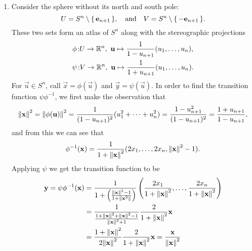 \documentclass[12pt]{memoir}
\def\co{\colon}
\newcommand{\from}{\co\!\!}
\begin{document}
   \begin{ptcbr}
   \begin{enumerate}
	\item Consider the sphere without its north and south pole:
	$$U=S^n\setminus\{\,\mathbf{e}_{n+1}\,\},\quad\text{and}\quad V=S^n\setminus\{\,-\mathbf{e}_{n+1}\,\}.$$
	These two sets form an atlas of $S^n$ along with the stereographic projections
	\begin{gather*}
		\phi\from U\to\bR^n,\ \vec u\mapsto \frac{1}{1-u_{n+1}}(u_1,\dots,u_{n}),\\
		\psi\from V\to\bR^n,\ \vec u\mapsto \frac{1}{1+u_{n+1}}(u_1,\dots,u_{n}).
	\end{gather*}
	For $\vec u\in S^n$, call $\vec x=\phi(\vec u)$ and $\vec y=\psi(\vec u)$. In order to find the transition function $\psi\phi^{-1}$, we first make the observation that 
	$$\norm{\mathbf{x}}^2=\norm{\phi(\mathbf{u})}^2=\frac{1}{(1-u_{n+1})^2}(u_1^2+\dots+u_{n}^2)=\frac{1-u_{n+1}^2}{(1-u_{n+1})^2}=\frac{1+u_{n+1}}{1-u_{n+1}},$$
	and from this we can see that 
	$$\phi^{-1}(\mathbf{x})=\frac{1}{1+\norm{\mathbf{x}}^2}(2x_1,\dots,2x_n,\norm{\mathbf{x}}^2-1).$$
	Applying $\psi$ we get the transition function to be
	\begin{align*}
		\mathbf{y}=\psi\phi^{-1}(\mathbf{x})&=\frac{1}{1+\left(\frac{\norm{\mathbf{x}}^2-1}{1+\norm{\mathbf{x}^2}}\right)}\left(\frac{2x_1}{1+\norm{\mathbf{x}}^2},\dots,\frac{2x_n}{1+\norm{\mathbf{x}}^2}\right)\\
		&=\frac{1}{\frac{1+\norm{\mathbf{x}}^2+\norm{\mathbf{x}}^2-1}{\norm{\mathbf{x}}^2+1}}\frac{2}{1+\norm{\mathbf{x}}^2}\mathbf{x}\\
		&=\frac{1+\norm{\mathbf{x}}^2}{2\norm{\mathbf{x}}^2}\frac{2}{1+\norm{\mathbf{x}}^2}\mathbf{x}=\frac{\mathbf{x}}{\norm{\mathbf{x}}^2}\\
	\end{align*}
	

\end{enumerate}
\end{ptcbr}
\end{document}
